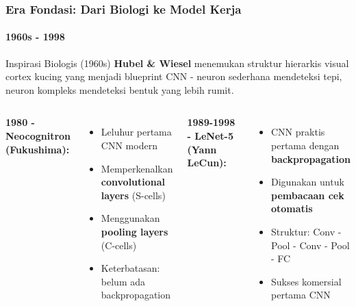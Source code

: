 \documentclass[t,aspectratio=169,xcolor=dvipsnames]{beamer}
\begin{document}
\begin{frame}
    \frametitle{Era Fondasi: Dari Biologi ke Model Kerja}
    \framesubtitle{1960s - 1998}
    \small

    \begin{block}{Inspirasi Biologis (1960s)}
        \textbf{Hubel \& Wiesel} menemukan struktur hierarkis visual cortex kucing yang menjadi blueprint CNN - neuron sederhana mendeteksi tepi, neuron kompleks mendeteksi bentuk yang lebih rumit.
    \end{block}

    \begin{columns}[t]
        \textbf{1980 - Neocognitron (Fukushima):}
        \begin{itemize}
            \item Leluhur pertama CNN modern
            \item Memperkenalkan \textbf{convolutional layers} (S-cells)
            \item Menggunakan \textbf{pooling layers} (C-cells)
            \item Keterbatasan: belum ada backpropagation
        \end{itemize}

        \textbf{1989-1998 - LeNet-5 (Yann LeCun):}
        \begin{itemize}
            \item CNN praktis pertama dengan \textbf{backpropagation}
            \item Digunakan untuk \textbf{pembacaan cek otomatis}
            \item Struktur: Conv - Pool - Conv - Pool - FC
            \item Sukses komersial pertama CNN
        \end{itemize}
    \end{columns}
\end{frame}
\end{document}

